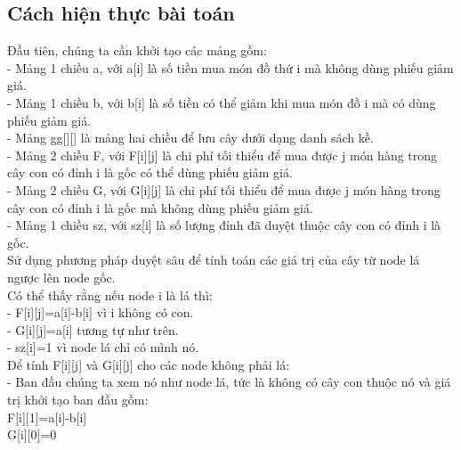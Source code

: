 \documentclass[10pt,a4paper]{article}
\begin{document}
\begin{flushleft}
\part{Cách hiện thực bài toán}
Đầu tiên, chúng ta cần khởi tạo các mảng gồm:\\
\hspace{1 cm}- Mảng 1 chiều a, với a[i] là số tiền mua món đồ thứ i mà không dùng phiếu giảm giá.\\
\hspace{1 cm}- Mảng 1 chiều b, với b[i] là số tiền có thể giảm khi mua món đồ i mà có dùng phiếu giảm giá.\\
\hspace{1 cm}- Mảng gg[][] là mảng hai chiều để lưu cây dưới dạng danh sách kề.\\
\hspace{1 cm}- Mảng 2 chiều F, với F[i][j] là  chi phí tối thiểu để mua được j món hàng trong cây con có đỉnh i là gốc có thể dùng phiếu giảm giá.\\
\hspace{1 cm}- Mảng 2 chiều G, với G[i][j] là chi phí tối thiểu để mua được j món hàng trong cây con có đỉnh i là gốc mà không dùng phiếu giảm giá.\\
\hspace{1 cm}- Mảng 1 chiều sz, với sz[i] là số lượng đỉnh đã duyệt thuộc cây con có đỉnh i là gốc.\\
\vspace{0.5 cm}
Sử dụng phương pháp duyệt sâu để tính toán các giá trị của cây từ node lá ngược lên node gốc.\\
\vspace{0.5 cm}
Có thể thấy rằng nếu node i là lá thì:\\
\hspace{1 cm}- F[i][j]=a[i]-b[i] vì i không có con.\\
\hspace{1 cm}- G[i][j]=a[i] tương tự như trên.\\
\hspace{1 cm}- sz[i]=1 vì node lá chỉ có mình nó.\\
Để tính F[i][j] và G[i][j] cho các node không phải lá:\\
\hspace{1 cm}- Ban đầu chúng ta xem nó như node lá, tức là không có cây con thuộc nó và giá trị khởi tạo ban đầu gồm:\\
\hspace{2 cm} F[i][1]=a[i]-b[i]\\
\hspace{2 cm} G[i][0]=0\\

\end{flushleft}
\end{document}
